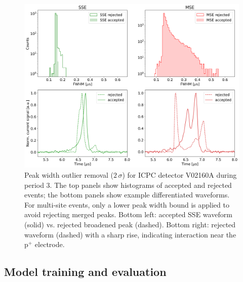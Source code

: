 \begin{figure}
    \centering
    \includegraphics[width=\linewidth]{figures/05_PSD/Plot_DataCleaning_fwhm_V02160A.png}
    \caption{Peak width outlier removal ($2 \, \sigma$) for ICPC detector V02160A during period 3. The top panels show histograms of accepted and rejected events; the bottom panels show example differentiated waveforms. For multi-site events, only a lower peak width bound is applied to avoid rejecting merged peaks. Bottom left: accepted SSE waveform (solid) vs. rejected broadened peak (dashed). Bottom right: rejected waveform (dashed) with a sharp rise, indicating interaction near the p$^{+}$ electrode.}
    \label{fig:datacleaning_fwhm}
\end{figure}

\subsection{Model training and evaluation}

